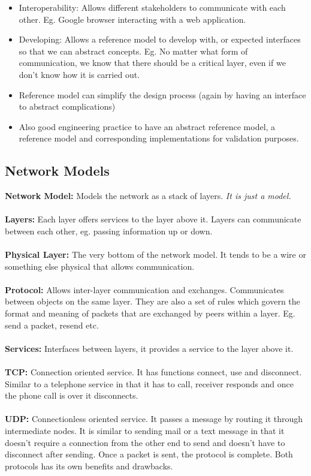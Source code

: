 \documentclass[a4paper,10pt]{article}
\begin{document}
\renewcommand{\labelitemi}{\textperiodcentered}
\begin{itemize}
	\item Interoperability: Allows different stakeholders to communicate with each other. Eg. Google browser interacting with a web application. 
	\item Developing: Allows a reference model to develop with, or expected interfaces so that we can abstract concepts. Eg. No matter what form of communication, we know that there should be a critical layer, even if we don't know how it is carried out. 
	\item Reference model can simplify the design process (again by having an interface to abstract complications)
	\item Also good engineering practice to have an abstract reference model, a reference model and corresponding implementations for validation purposes.
\end{itemize}
\subsection{Network Models}
\textcolor{TealBlue}{\textbf{Network Model:}} Models the network as a stack of layers. \emph{It is just a model.} \\\\
\textcolor{TealBlue}{\textbf{Layers:}} Each layer offers services to the layer above it. Layers can communicate between each other, eg. passing information up or down.\\\\
\textcolor{TealBlue}{\textbf{Physical Layer:}} The very bottom of the network model. It tends to be a wire or something else physical that allows communication. \\\\
\textcolor{TealBlue}{\textbf{Protocol:}} Allows inter-layer communication and exchanges. Communicates between objects on the same layer. They are also a set of rules which govern the format and meaning of packets that are exchanged by peers within a layer. Eg. send a packet, resend etc.\\\\
\textcolor{TealBlue}{\textbf{Services:}} Interfaces between layers, it provides a service to the layer above it. \\\\
\textcolor{TealBlue}{\textbf{TCP:}} Connection oriented service. It has functions connect, use and disconnect. Similar to a telephone service in that it has to call, receiver responds and once the phone call is over it disconnects. \\\\
\textcolor{TealBlue}{\textbf{UDP:}} Connectionless oriented service. It passes a message by routing it through intermediate nodes. It is similar to sending mail or a text message in that it doesn't require a connection from the other end to send and doesn't have to disconnect after sending. Once a packet is sent, the protocol is complete. Both protocols has its own benefits and drawbacks.
\end{document}
